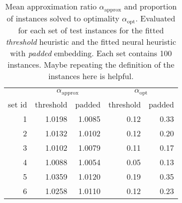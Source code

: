 

\begin{knitrout}
\color{fgcolor}\begin{table}

\caption{\label{tab:unnamed-chunk-2}Mean approximation ratio $\alpha_\text{approx}$ and proportion of instances solved to optimality $\alpha_\text{opt}$. Evaluated for each set of test instances for the fitted \textit{threshold} heuristic and the fitted neural heuristic with \textit{padded} embedding. Each set contains 100 instances. {\color{blue} Maybe repeating the definition of the instances here is helpful. } \label{tab:objectives}}
\centering
\begin{tabular}[t]{rrrrr}
\toprule
\multicolumn{1}{c}{ } & \multicolumn{2}{c}{$\alpha_\text{approx}$} & \multicolumn{2}{c}{$\alpha_\text{opt}$} \\
\cmidrule(l{3pt}r{3pt}){2-3} \cmidrule(l{3pt}r{3pt}){4-5}
set id & threshold & padded & threshold & padded\\
\midrule
1 & 1.0198 & 1.0085 & 0.12 & 0.33\\
2 & 1.0132 & 1.0102 & 0.12 & 0.20\\
3 & 1.0102 & 1.0079 & 0.11 & 0.17\\
4 & 1.0088 & 1.0054 & 0.05 & 0.13\\
5 & 1.0359 & 1.0120 & 0.19 & 0.35\\
6 & 1.0258 & 1.0110 & 0.12 & 0.23\\
\bottomrule
\end{tabular}
\end{table}

\end{knitrout}
